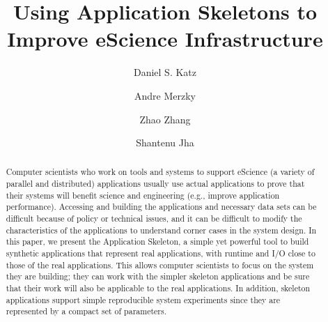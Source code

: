 \documentclass[preprint,12pt]{elsarticle}
\begin{document}
\begin{frontmatter}



\title{Using Application Skeletons to Improve eScience Infrastructure}


\author[ucanl]{Daniel S. Katz}

\author[rutgers]{Andre Merzky}

\author[ucb]{Zhao Zhang}

\author[rutgers]{Shantenu Jha}


\address[ucanl]{Computation Institute, University of Chicago and Argonne National Laboratory, Chicago, IL, USA}
\address[rutgers]{RADICAL Laboratory, Rutgers University, New Brunswick, NJ, USA}
\address[ucb]{Electrical Engineering \& Computer Science, University of California, Berkeley, CA, USA}


\begin{abstract}

Computer scientists who work on tools and systems to support
eScience (a variety of parallel and distributed) applications usually use actual applications to prove that their
systems will benefit science and engineering (e.g., improve application performance). Accessing and building the applications and necessary data sets can be difficult because of policy
or technical issues, and it can be difficult to modify the characteristics of the applications to understand corner cases in the system design.
In this paper, we present the Application Skeleton, a simple yet powerful 
tool to build synthetic applications that represent real applications, with runtime and I/O 
close to those of the real applications. This allows computer 
scientists to focus on the system they are building; they can work with the simpler skeleton 
applications and be sure that their work will also be applicable to the real applications. 
In addition, skeleton applications support simple
reproducible system experiments since they are represented by a compact set of parameters.


\end{abstract}
\end{frontmatter}
\end{document}
